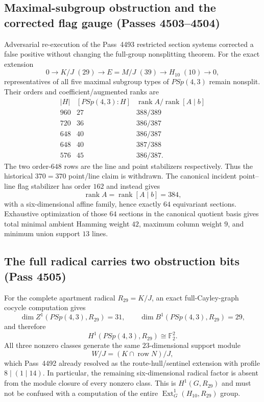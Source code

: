\subsection{Maximal-subgroup obstruction and the corrected flag gauge (Passes 4503--4504)}
\label{sec:pass4503-4510-apartment-obstruction-scaling}

Adversarial re-execution of the Pass~4493 restricted section systems corrected a
false positive without changing the full-group nonsplitting theorem.  For the
exact extension
\[
0\to K/J\;(29)\to E=M/J\;(39)\to H_{10}\;(10)\to0,
\]
representatives of all five maximal subgroup types of $PSp(4,3)$ remain
nonsplit.  Their orders and coefficient/augmented ranks are
\[
\begin{array}{c|c|c}
|H|&[PSp(4,3):H]&\operatorname{rank}A/\operatorname{rank}[A\mid b]\\ \hline
960&27&388/389\\
720&36&386/387\\
648&40&386/387\\
648&40&387/388\\
576&45&386/387.
\end{array}
\]
The two order-$648$ rows are the line and point stabilizers respectively.  Thus
the historical $370=370$ point/line claim is withdrawn.  The canonical incident
point--line flag stabilizer has order $162$ and instead gives
\[
\boxed{\operatorname{rank}A=\operatorname{rank}[A\mid b]=384},
\]
with a six-dimensional affine family, hence exactly $64$ equivariant sections.
Exhaustive optimization of those $64$ sections in the canonical quotient basis
gives total minimal ambient Hamming weight $42$, maximum column weight $9$, and
minimum union support $13$ lines.

\subsection{The full radical carries two obstruction bits (Pass 4505)}

For the complete apartment radical $R_{29}=K/J$, an exact full-Cayley-graph
cocycle computation gives
\[
\dim Z^1(PSp(4,3),R_{29})=31,\qquad
\dim B^1(PSp(4,3),R_{29})=29,
\]
and therefore
\[
\boxed{H^1(PSp(4,3),R_{29})\cong\mathbb F_2^2.}
\]
All three nonzero classes generate the same $23$-dimensional support module
\[
W/J=(K\cap\operatorname{row}N)/J,
\]
which Pass~4492 already resolved as the route-hull/sentinel extension with
profile $8\mid(1\mid14)$.  In particular, the remaining six-dimensional radical
factor is absent from the module closure of every nonzero class.  This is
$H^1(G,R_{29})$ and must not be confused with a computation of the entire
$\operatorname{Ext}^1_G(H_{10},R_{29})$ group.

